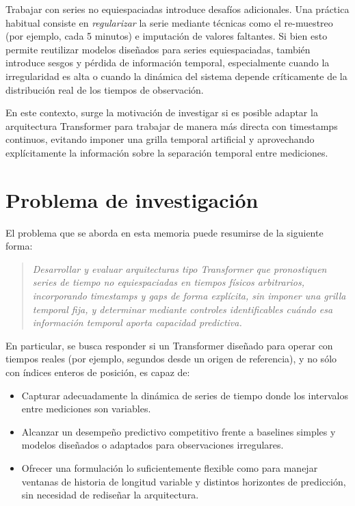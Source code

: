 \hfill

Trabajar con series no equiespaciadas introduce desafíos adicionales. Una práctica habitual consiste en \textit{regularizar} la serie mediante técnicas como el re-muestreo (por ejemplo, cada 5 minutos) e imputación de valores faltantes. Si bien esto permite reutilizar modelos diseñados para series equiespaciadas, también introduce sesgos y pérdida de información temporal, especialmente cuando la irregularidad es alta o cuando la dinámica del sistema depende críticamente de la distribución real de los tiempos de observación.

\hfill

En este contexto, surge la motivación de investigar si es posible adaptar la arquitectura Transformer para trabajar de manera más directa con timestamps continuos, evitando imponer una grilla temporal artificial y aprovechando explícitamente la información sobre la separación temporal entre mediciones.

\section{Problema de investigación}

El problema que se aborda en esta memoria puede resumirse de la siguiente forma:

\begin{quote}
    \textit{Desarrollar y evaluar arquitecturas tipo Transformer que pronostiquen series de tiempo no equiespaciadas en tiempos físicos arbitrarios, incorporando timestamps y gaps de forma explícita, sin imponer una grilla temporal fija, y determinar mediante controles identificables cuándo esa información temporal aporta capacidad predictiva.}
\end{quote}

En particular, se busca responder si un Transformer diseñado para operar con tiempos reales (por ejemplo, segundos desde un origen de referencia), y no sólo con índices enteros de posición, es capaz de:
\begin{itemize}
    \item Capturar adecuadamente la dinámica de series de tiempo donde los intervalos entre mediciones son variables.
    \item Alcanzar un desempeño predictivo competitivo frente a baselines simples y modelos diseñados o adaptados para observaciones irregulares.
    \item Ofrecer una formulación lo suficientemente flexible como para manejar ventanas de historia de longitud variable y distintos horizontes de predicción, sin necesidad de rediseñar la arquitectura.
\end{itemize}

